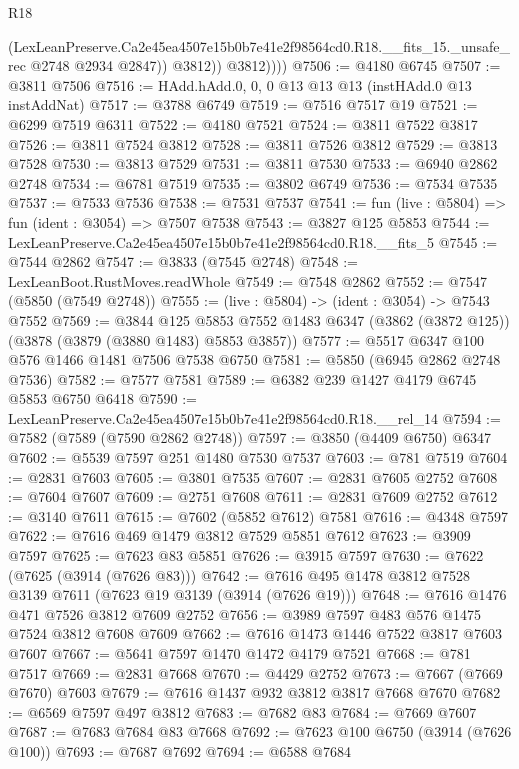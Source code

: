 \begin{lexlean}{R18}
\begin{coremodule}
                  (LexLeanPreserve.Ca2e45ea4507e15b0b7e41e2f98564cd0.R18.__fits_15._unsafe_rec
                    @2748
                    @2934
                    @2847))
                @3812))
            @3812))))
@7506 := @4180 @6745
@7507 := @3811 @7506
@7516 := HAdd.hAdd.{0, 0, 0} @13 @13 @13 (instHAdd.{0} @13 instAddNat)
@7517 := @3788 @6749
@7519 := @7516 @7517 @19
@7521 := @6299 @7519 @6311
@7522 := @4180 @7521
@7524 := @3811 @7522 @3817
@7526 := @3811 @7524 @3812
@7528 := @3811 @7526 @3812
@7529 := @3813 @7528
@7530 := @3813 @7529
@7531 := @3811 @7530
@7533 := @6940 @2862 @2748
@7534 := @6781 @7519
@7535 := @3802 @6749
@7536 := @7534 @7535
@7537 := @7533 @7536
@7538 := @7531 @7537
@7541 := fun (live : @5804) => fun (ident : @3054) => @7507 @7538
@7543 := @3827 @125 @5853
@7544 := LexLeanPreserve.Ca2e45ea4507e15b0b7e41e2f98564cd0.R18.__fits_5
@7545 := @7544 @2862
@7547 := @3833 (@7545 @2748)
@7548 := LexLeanBoot.RustMoves.readWhole
@7549 := @7548 @2862
@7552 := @7547 (@5850 (@7549 @2748))
@7555 := (live : @5804) -> (ident : @3054) -> @7543 @7552
@7569 := @3844
    @125
    @5853
    @7552
    @1483
    @6347
    (@3862 (@3872 @125))
    (@3878 (@3879 (@3880 @1483) @5853 @3857))
@7577 := @5517 @6347 @100 @576 @1466 @1481 @7506 @7538 @6750
@7581 := @5850 (@6945 @2862 @2748 @7536)
@7582 := @7577 @7581
@7589 := @6382 @239 @1427 @4179 @6745 @5853 @6750 @6418
@7590 := LexLeanPreserve.Ca2e45ea4507e15b0b7e41e2f98564cd0.R18.__rel_14
@7594 := @7582 (@7589 (@7590 @2862 @2748))
@7597 := @3850 (@4409 @6750) @6347
@7602 := @5539 @7597 @251 @1480 @7530 @7537
@7603 := @781 @7519
@7604 := @2831 @7603
@7605 := @3801 @7535
@7607 := @2831 @7605 @2752
@7608 := @7604 @7607
@7609 := @2751 @7608
@7611 := @2831 @7609 @2752
@7612 := @3140 @7611
@7615 := @7602 (@5852 @7612) @7581
@7616 := @4348 @7597
@7622 := @7616 @469 @1479 @3812 @7529 @5851 @7612
@7623 := @3909 @7597
@7625 := @7623 @83 @5851
@7626 := @3915 @7597
@7630 := @7622 (@7625 (@3914 (@7626 @83)))
@7642 := @7616 @495 @1478 @3812 @7528 @3139 @7611 (@7623 @19 @3139 (@3914 (@7626 @19)))
@7648 := @7616 @1476 @471 @7526 @3812 @7609 @2752
@7656 := @3989 @7597 @483 @576 @1475 @7524 @3812 @7608 @7609
@7662 := @7616 @1473 @1446 @7522 @3817 @7603 @7607
@7667 := @5641 @7597 @1470 @1472 @4179 @7521
@7668 := @781 @7517
@7669 := @2831 @7668
@7670 := @4429 @2752
@7673 := @7667 (@7669 @7670) @7603
@7679 := @7616 @1437 @932 @3812 @3817 @7668 @7670
@7682 := @6569 @7597 @497 @3812
@7683 := @7682 @83
@7684 := @7669 @7607
@7687 := @7683 @7684 @83 @7668
@7692 := @7623 @100 @6750 (@3914 (@7626 @100))
@7693 := @7687 @7692
@7694 := @6588 @7684

\end{coremodule}
\end{lexlean}
